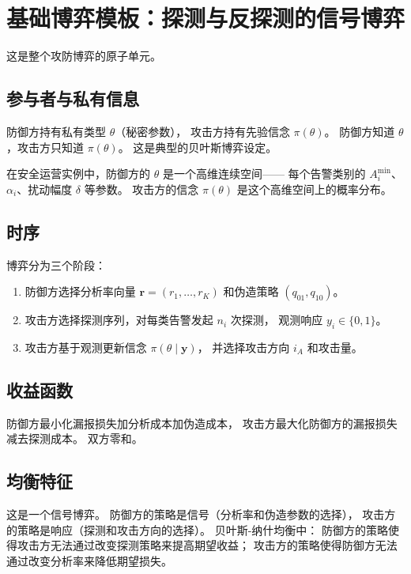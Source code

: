 \documentclass[11pt,a4paper]{article}
\begin{document}
\section{基础博弈模板：探测与反探测的信号博弈}

这是整个攻防博弈的原子单元。

\subsection{参与者与私有信息}

防御方持有私有类型 \(\theta\)（秘密参数），
攻击方持有先验信念 \(\pi(\theta)\)。
防御方知道 \(\theta\)，攻击方只知道 \(\pi(\theta)\)。
这是典型的贝叶斯博弈设定。

在安全运营实例中，防御方的 \(\theta\) 是一个高维连续空间——
每个告警类别的 \(A_i^{\min}\)、\(\alpha_i\)、扰动幅度 \(\delta\) 等参数。
攻击方的信念 \(\pi(\theta)\) 是这个高维空间上的概率分布。

\subsection{时序}

博弈分为三个阶段：
\begin{enumerate}[label=(\arabic*)]
    \item 防御方选择分析率向量 \(\mathbf{r} = (r_1,\dots,r_K)\)
          和伪造策略 \((q_{01}, q_{10})\)。
    \item 攻击方选择探测序列，对每类告警发起 \(n_i\) 次探测，
          观测响应 \(y_i \in \{0,1\}\)。
    \item 攻击方基于观测更新信念 \(\pi(\theta \mid \mathbf{y})\)，
          并选择攻击方向 \(i_A\) 和攻击量。
\end{enumerate}

\subsection{收益函数}

防御方最小化漏报损失加分析成本加伪造成本，
攻击方最大化防御方的漏报损失减去探测成本。
双方零和。

\subsection{均衡特征}

这是一个信号博弈。
防御方的策略是信号（分析率和伪造参数的选择），
攻击方的策略是响应（探测和攻击方向的选择）。
贝叶斯-纳什均衡中：
防御方的策略使得攻击方无法通过改变探测策略来提高期望收益；
攻击方的策略使得防御方无法通过改变分析率来降低期望损失。
\end{document}
